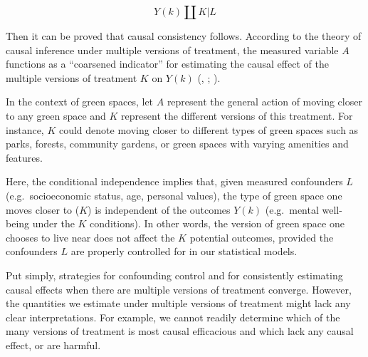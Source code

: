 \documentclass[
  singlecolumn]{article}
\begin{document}
\[
Y(k) \coprod K | L
\]

Then it can be proved that causal consistency follows. According to the
theory of causal inference under multiple versions of treatment, the
measured variable \(A\) functions as a ``coarsened indicator'' for
estimating the causal effect of the multiple versions of treatment \(K\)
on \(Y(k)\) (,
;
).

In the context of green spaces, let \(A\) represent the general action
of moving closer to any green space and \(K\) represent the different
versions of this treatment. For instance, \(K\) could denote moving
closer to different types of green spaces such as parks, forests,
community gardens, or green spaces with varying amenities and features.

Here, the conditional independence implies that, given measured
confounders \(L\) (e.g.~socioeconomic status, age, personal values), the
type of green space one moves closer to (\(K\)) is independent of the
outcomes \(Y(k)\) (e.g.~mental well-being under the \(K\) conditions).
In other words, the version of green space one chooses to live near does
not affect the \(K\) potential outcomes, provided the confounders \(L\)
are properly controlled for in our statistical models.

Put simply, strategies for confounding control and for consistently
estimating causal effects when there are multiple versions of treatment
converge. However, the quantities we estimate under multiple versions of
treatment might lack any clear interpretations. For example, we cannot
readily determine which of the many versions of treatment is most causal
efficacious and which lack any causal effect, or are harmful.
\end{document}
